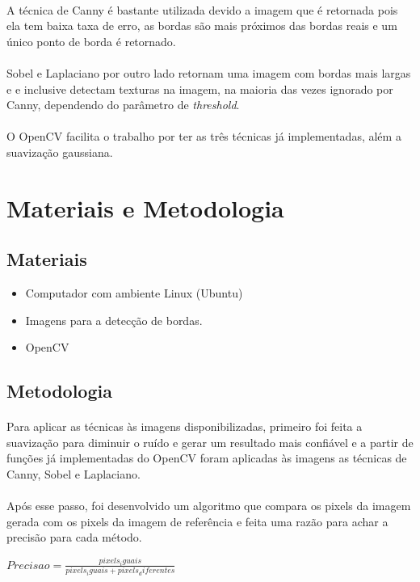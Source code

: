 \documentclass[conference, harvard, brazil, english]{sbatex}
\begin{document}
		\paragraph{}
		A técnica de Canny é bastante utilizada devido a imagem que é retornada pois ela tem baixa taxa de erro, as bordas são mais próximos das bordas reais e um único ponto de borda é retornado.
		\paragraph{}
		Sobel e Laplaciano por outro lado retornam uma imagem com bordas mais largas e e inclusive detectam texturas na imagem, na maioria das vezes ignorado por Canny, dependendo do parâmetro de \textit{threshold}.
		\paragraph{}
		O OpenCV facilita o trabalho por ter as três técnicas já implementadas, além a suavização gaussiana.
		
		\section{Materiais e Metodologia}
		\subsection{Materiais}
			\begin{itemize}
				\item Computador com ambiente Linux (Ubuntu)
				\item Imagens para a detecção de bordas.
				\item OpenCV
			\end{itemize}
		\subsection{Metodologia}
			\paragraph{}
			Para aplicar as técnicas às imagens disponibilizadas, primeiro foi feita a suavização para diminuir o ruído e gerar um resultado mais confiável e a partir de funções já implementadas do OpenCV foram aplicadas às imagens as técnicas de Canny, Sobel e Laplaciano.
			\paragraph{}
			Após esse passo, foi desenvolvido um algoritmo que compara os pixels da imagem gerada com os pixels da imagem de referência e feita uma razão para achar a precisão para cada método.
			\begin{centering}
			 $ Precisao = \frac{pixels_ iguais}{pixels_ iguais + pixels_ diferentes} $ 
			\end{centering}
\end{document}
